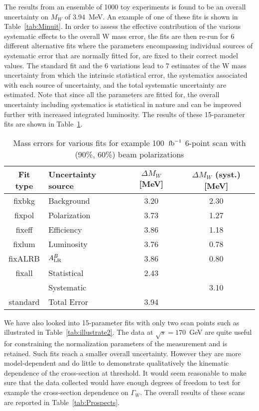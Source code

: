 \documentclass[12pt]{article}
\begin{document}
The results from an ensemble of 1000 toy experiments is found to be an overall uncertainty on $M_W$ of 3.94~MeV. 
An example of one of these fits is shown in Table~\ref{tab:Minuit}.
In order to assess the effective contribution of the various systematic effects 
to the overall W mass error, the fits are then re-run for 6 different alternative fits 
where the parameters encompassing individual sources of systematic error that 
are normally fitted for, are fixed to their correct model values. 
The standard fit and the 6 variations lead to 7 estimates of the W mass uncertainty 
from which the intrinsic statistical error, the systematics associated with each 
source of uncertainty, and the total systematic uncertainty are estimated.
Note that since all the parameters are fitted for, the overall uncertainty including systematics is statistical in nature 
and can be improved further with increased integrated luminosity. The results of these 15-parameter fits 
are shown in Table~\ref{tab:systerrors}.

\begin{table}[!htb]
\begin{center}
\begin{tabular}{c|l|c|c}
Fit type &    Uncertainty source      &    $\Delta M_W$ [MeV]   &   $\Delta M_W$ (syst.) [MeV]  \\ \hline
fixbkg   &    Background              &   3.20          &     2.30    \\
fixpol   &    Polarization  &   3.73          &     1.27    \\
fixeff   &    Efficiency    &   3.86          &     1.18    \\
fixlum   &    Luminosity    &   3.76          &     0.78    \\
fixALRB  &    $A_{\rm{LR}}^B$       &  3.86          &     0.80    \\  \hline
fixall   &    Statistical   &   2.43           &             \\   
         & Systematic       &                  &       3.10      \\
standard & Total Error      &   3.94           &             \\   \hline
\end{tabular}
\caption{Mass errors for various fits for example 100~$\rm{fb}^{-1}$ 6-point scan with (90\%, 60\%) beam polarizations}
\label{tab:systerrors}
\end{center}
\end{table} 

We have also looked into 15-parameter fits with only two scan points such as illustrated in Table~\ref{tab:illustrate2}. 
The data at $\sqrt{s}=170$~GeV are quite useful for constraining the normalization parameters of the measurement 
and is retained. Such fits reach a smaller overall uncertainty. However they are more model-dependent and 
do little to demonstrate qualitatively the kinematic dependence of the cross-section at threshold. 
It would seem reasonable to make sure that the data collected would have enough degrees of freedom 
to test for example the cross-section dependence on $\Gamma_W$. 
The overall results of these scans are reported in Table~\ref{tab:Prospects}.
\end{document}
